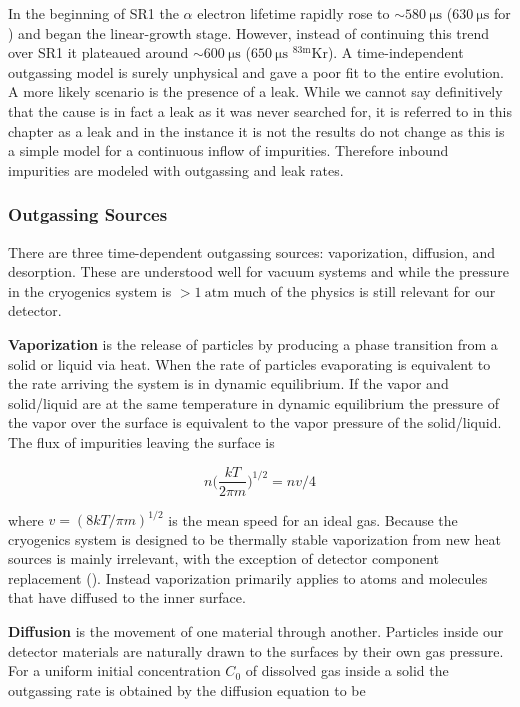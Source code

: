 In the beginning of SR1 the $\alpha$ electron lifetime rapidly rose to ${\sim} 580\ \mathrm{\mu s}$ ($630\ \mathrm{\mu s}$ for \metakr)
and began the linear-growth stage.  However, instead of continuing this trend over SR1
it plateaued around ${\sim} 600\ \mathrm{\mu s}$ ($650\ \mathrm{\mu s}$ $\mathrm{^{83m}Kr}$).  A time-independent outgassing model is
surely unphysical and
gave a poor fit to the entire evolution.  A more likely scenario is the presence of a leak.  While we cannot say definitively that the
cause is in fact a leak as it was never searched for, it is referred to in this chapter as a leak and in the instance it is not the
results do not change as this is a simple model for a continuous inflow of impurities.  Therefore inbound impurities are modeled with
outgassing and leak rates.



\subsubsection{Outgassing Sources}
\label{subsubsec:electron_lifetime_model_outgassing_sources}
There are three time-dependent outgassing sources: vaporization, diffusion, and desorption.  These are understood well for vacuum systems
and while the pressure in the cryogenics system is $> 1\ \mathrm{atm}$ much of the physics is still relevant for our detector.

\textbf{Vaporization} is the release of particles by producing a phase transition from a solid or liquid via heat.  When the rate of
particles evaporating is equivalent to the rate arriving the system is in dynamic equilibrium.  If the vapor and solid/liquid are at the
same temperature in dynamic equilibrium the pressure of the vapor over the surface is equivalent to the vapor pressure of the
solid/liquid.  The flux of impurities leaving the surface is

\begin{equation}
n \bigg( \frac{kT}{2 \pi m} \bigg)^{1/2} = nv/4
\end{equation}

\noindent where $v = (8kT/\pi m)^{1/2}$ is the mean speed for an ideal gas.  Because the cryogenics system is designed to be thermally
stable vaporization from new heat sources is mainly irrelevant, with the exception of detector component replacement
().  Instead vaporization primarily applies to atoms and molecules that have diffused to the
inner surface.

\textbf{Diffusion} is the movement of one material through another.  Particles inside our detector materials are naturally drawn to the
surfaces by their own gas pressure.  For a uniform initial concentration $C_0$ of dissolved gas inside a solid the outgassing rate is
obtained by the diffusion equation to be

